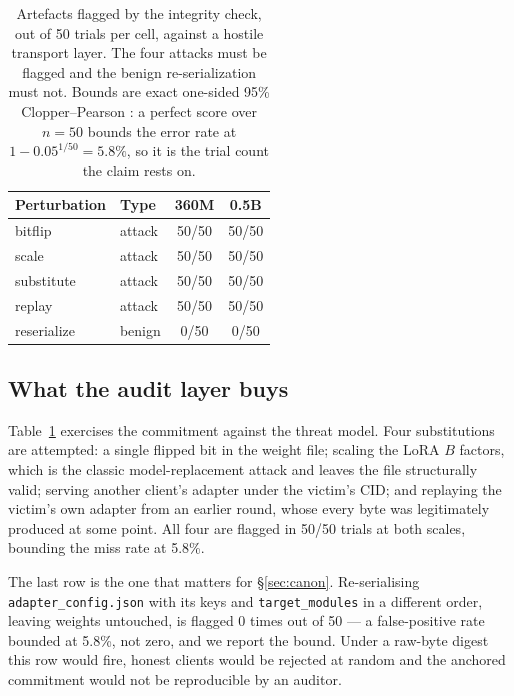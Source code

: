 \documentclass[11pt]{article}
\begin{document}
\begin{table}[t]
\centering
\small
\setlength{\tabcolsep}{4pt}
\begin{tabular}{llcc}
\toprule
\textbf{Perturbation} & \textbf{Type} & \textbf{360M} & \textbf{0.5B} \\
\midrule
bitflip     & attack & 50/50 & 50/50 \\
scale       & attack & 50/50 & 50/50 \\
substitute  & attack & 50/50 & 50/50 \\
replay      & attack & 50/50 & 50/50 \\
\midrule
reserialize & benign & 0/50 & 0/50 \\
\bottomrule
\end{tabular}
\caption{Artefacts flagged by the integrity check, out of 50 trials per cell, against a hostile transport layer. The four attacks must be flagged and the benign re-serialization must not. Bounds are exact one-sided 95\% Clopper--Pearson \cite{clopper1934use}: a perfect score over $n{=}50$ bounds the error rate at $1 - 0.05^{1/50} = 5.8\%$, so it is the trial count the claim rests on.}
\label{tab:tamper}
\end{table}

\subsection{What the audit layer buys}
\label{sec:tamper}

Table~\ref{tab:tamper} exercises the commitment against the threat model. Four substitutions are attempted: a single flipped bit in the weight file; scaling the LoRA $B$ factors, which is the classic model-replacement attack and leaves the file structurally valid; serving another client's adapter under the victim's CID; and replaying the victim's own adapter from an earlier round, whose every byte was legitimately produced at some point. All four are flagged in 50/50 trials at both scales, bounding the miss rate at 5.8\%.

The last row is the one that matters for \S\ref{sec:canon}. Re-serialising \texttt{adapter\_config.json} with its keys and \texttt{target\_modules} in a different order, leaving weights untouched, is flagged 0 times out of 50 --- a false-positive rate bounded at 5.8\%, not zero, and we report the bound. Under a raw-byte digest this row would fire, honest clients would be rejected at random and the anchored commitment would not be reproducible by an auditor.
\end{document}
